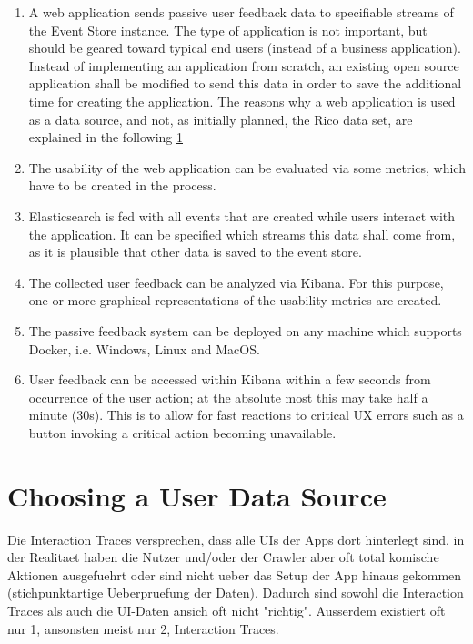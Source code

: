 \begin{enumerate}
\item A web application sends passive user feedback data to specifiable streams of the Event Store instance.
The type of application is not important, but should be geared toward typical end users (instead of a business application).
Instead of implementing an application from scratch, an existing open source application shall be modified to send this data in order to save the additional time for creating the application.
The reasons why a web application is used as a data source, and not, as initially planned, the Rico data set, are explained in the following \cref{sec:design:data-source}
\item The usability of the web application can be evaluated via some metrics, which have to be created in the process.
\item Elasticsearch is fed with all events that are created while users interact with the application.
It can be specified which streams this data shall come from, as it is plausible that other data is saved to the event store.
\item The collected user feedback can be analyzed via Kibana.
For this purpose, one or more graphical representations of the usability metrics are created.
\item The passive feedback system can be deployed on any machine which supports Docker, i.e. Windows, Linux and MacOS.
\item User feedback can be accessed within Kibana within a few seconds from occurrence of the user action; at the absolute most this may take half a minute (30s).
This is to allow for fast reactions to critical \ac{UX} errors such as a button invoking a critical action becoming unavailable.
\end{enumerate}


\section{Choosing a User Data Source}
\label{sec:design:data-source}

Die Interaction Traces versprechen, dass alle UIs der Apps dort hinterlegt sind, in der Realitaet haben die Nutzer und/oder der Crawler aber oft total komische Aktionen ausgefuehrt oder sind nicht ueber das Setup der App hinaus gekommen (stichpunktartige Ueberpruefung der Daten).
Dadurch sind sowohl die Interaction Traces als auch die UI-Daten ansich oft nicht "richtig".
Ausserdem existiert oft nur 1, ansonsten meist nur 2, Interaction Traces.

